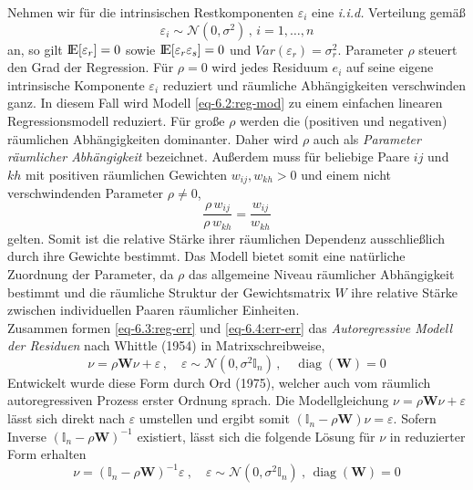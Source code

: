 Nehmen wir für die intrinsischen Restkomponenten $\varepsilon_{i}$ eine \emph{i.i.d.} Verteilung gemäß 
\begin{equation} \label{eq-6.4:err-err}
    \varepsilon_{i} \sim \mathcal{N}(0,\sigma^{2}) \, , \, i=1,\ldots,n
\end{equation}  
an, so gilt ${\rm I\!E}[\varepsilon_{r}]=0$ sowie ${\rm I\!E}[\varepsilon_{r}\varepsilon_{s}]=0$ 
und $Var(\varepsilon_{r})=\sigma_{r}^{2}$. 
Parameter $\rho$ steuert den Grad der Regression. 
Für $\rho = 0$ wird jedes Residuum $e_{i}$ auf seine eigene intrinsische 
Komponente $\varepsilon_{i}$ reduziert und räumliche Abhängigkeiten verschwinden ganz. 
In diesem Fall wird Modell \eqref{eq-6.2:reg-mod} zu einem einfachen linearen Regressionsmodell reduziert.
Für große $\rho$ werden die (positiven und negativen) räumlichen 
Abhängigkeiten dominanter. Daher wird $\rho$ auch als \emph{Parameter räumlicher Abhängigkeit} 
bezeichnet. 
Außerdem muss für beliebige Paare $ij$ und $kh$ mit positiven räumlichen 
Gewichten $w_{ij},w_{kh}>0$ und einem nicht verschwindenden Parameter $\rho \neq 0$, 
\begin{equation*}
    \frac{\rho \, w_{ij}}{\rho \, w_{kh}} = \frac{w_{ij}}{w_{kh}}
\end{equation*}
gelten. Somit ist die relative Stärke ihrer räumlichen Dependenz ausschließlich durch ihre Gewichte bestimmt.
Das Modell bietet somit eine natürliche Zuordnung der Parameter, 
da $\rho$ das allgemeine Niveau räumlicher Abhängigkeit bestimmt und die räumliche 
Struktur der Gewichtsmatrix $W$ ihre relative Stärke zwischen individuellen Paaren räumlicher Einheiten.\\

Zusammen formen \eqref{eq-6.3:reg-err} und \eqref{eq-6.4:err-err} 
das \emph{Autoregressive Modell der Residuen} nach Whittle (1954)
in Matrixschreibweise, 
\begin{equation}\label{eq-6.5:reg-vec}
    \nu=\rho \mathbf{W} \nu + \varepsilon \, , \quad \varepsilon \sim \mathcal{N}(0,\sigma^{2} \mathds{I}_{n}) \, , 
    \quad \operatorname{diag}(\mathbf{W})=0
\end{equation}
Entwickelt wurde diese Form durch Ord (1975), welcher auch vom 
räumlich autoregressiven Prozess erster Ordnung sprach.
Die Modellgleichung $\nu=\rho \mathbf{W} \nu + \varepsilon$ lässt sich direkt nach $\varepsilon$ 
umstellen und ergibt somit $(\mathds{I}_{n} -\rho \mathbf{W}) \nu =\varepsilon$. 
Sofern Inverse $(\mathds{I}_{n} -\rho \mathbf{W})^{-1}$ existiert, lässt sich die 
folgende Lösung für $\nu$ in reduzierter Form erhalten
\begin{equation} \label{eq-6.6:reg-red}
    \nu=(\mathds{I}_{n} -\rho \mathbf{W})^{-1} \varepsilon ~ , \quad 
    \varepsilon \sim \mathcal{N}(0,\sigma^{2} \mathds{I}_{n}) ~ , \, \operatorname{diag}(\mathbf{W})=0
\end{equation}

